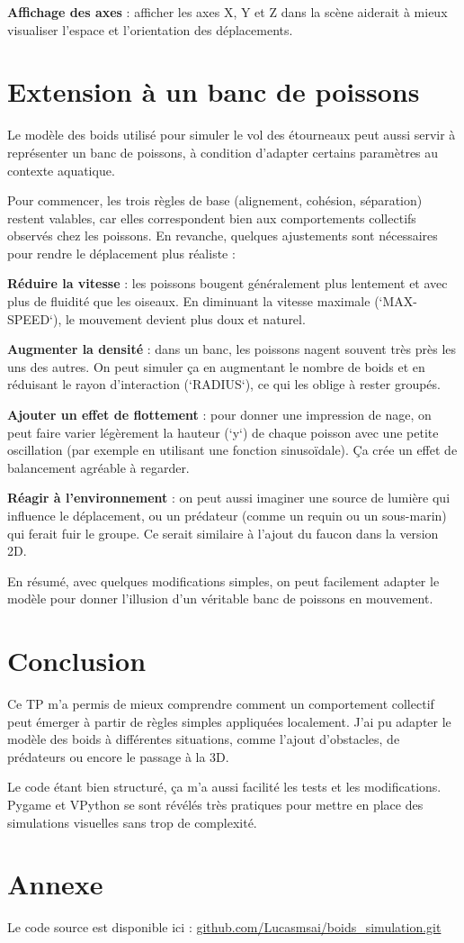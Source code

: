 \documentclass{article}
\begin{document}
\textbf{Affichage des axes} : afficher les axes X, Y et Z dans la scène aiderait à mieux visualiser l’espace et l’orientation des déplacements.

\section{Extension à un banc de poissons}
Le modèle des boids utilisé pour simuler le vol des étourneaux peut aussi servir à représenter un banc de poissons, à condition d’adapter certains paramètres au contexte aquatique.

Pour commencer, les trois règles de base (alignement, cohésion, séparation) restent valables, car elles correspondent bien aux comportements collectifs observés chez les poissons. En revanche, quelques ajustements sont nécessaires pour rendre le déplacement plus réaliste :

\textbf{Réduire la vitesse} : les poissons bougent généralement plus lentement et avec plus de fluidité que les oiseaux. En diminuant la vitesse maximale (`MAX-SPEED`), le mouvement devient plus doux et naturel.

\textbf{Augmenter la densité} : dans un banc, les poissons nagent souvent très près les uns des autres. On peut simuler ça en augmentant le nombre de boids et en réduisant le rayon d’interaction (`RADIUS`), ce qui les oblige à rester groupés.

\textbf{Ajouter un effet de flottement} : pour donner une impression de nage, on peut faire varier légèrement la hauteur (`y`) de chaque poisson avec une petite oscillation (par exemple en utilisant une fonction sinusoïdale). Ça crée un effet de balancement agréable à regarder.

\textbf{Réagir à l’environnement} : on peut aussi imaginer une source de lumière qui influence le déplacement, ou un prédateur (comme un requin ou un sous-marin) qui ferait fuir le groupe. Ce serait similaire à l’ajout du faucon dans la version 2D.

En résumé, avec quelques modifications simples, on peut facilement adapter le modèle pour donner l’illusion d’un véritable banc de poissons en mouvement.

\section{Conclusion}
Ce TP m’a permis de mieux comprendre comment un comportement collectif peut émerger à partir de règles simples appliquées localement. J’ai pu adapter le modèle des boids à différentes situations, comme l’ajout d’obstacles, de prédateurs ou encore le passage à la 3D.

Le code étant bien structuré, ça m’a aussi facilité les tests et les modifications. Pygame et VPython se sont révélés très pratiques pour mettre en place des simulations visuelles sans trop de complexité.

\section*{Annexe}
Le code source est disponible ici : \href{https://github.com/Lucasmsai/boids_simulation.git}{github.com/Lucasmsai/boids_simulation.git}
\end{document}
